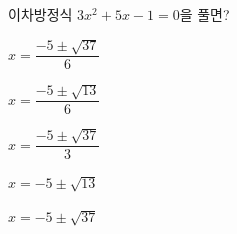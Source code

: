 이차방정식 $3x^2+5x-1=0$을 풀면?
\begin{choicesii}{\rule[-3ex]{0pt}{8ex}$x=\dfrac{-5\pm\sqrt{37}}{6}$}{\rule[-3ex]{0pt}{8ex}$x=\dfrac{-5\pm\sqrt{13}}{6}$}{\rule[-3ex]{0pt}{8ex}$x=\dfrac{-5\pm\sqrt{37}}{3}$}{\rule[-3ex]{0pt}{8ex}$x=-5\pm\sqrt{13}$}{\rule[-3ex]{0pt}{8ex}$x=-5\pm\sqrt{37}$}\end{choicesii}
